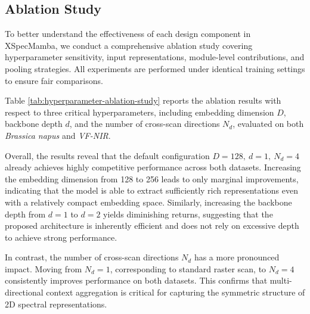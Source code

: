 \documentclass[pdflatex,sn-mathphys-num]{sn-jnl}%
\begin{document}
\subsection{Ablation Study}\label{sec:ablation-study}

To better understand the effectiveness of each design component in XSpecMamba, we conduct a comprehensive ablation study covering hyperparameter sensitivity, input representations, module-level contributions, and pooling strategies. All experiments are performed under identical training settings to ensure fair comparisons.

Table \ref{tab:hyperparameter-ablation-study} reports the ablation results with respect to three critical hyperparameters, including embedding dimension $D$, backbone depth $d$, and the number of cross-scan directions $N_d$, evaluated on both \textit{Brassica napus} and \textit{VF-NIR}.

Overall, the results reveal that the default configuration $D=128,\ d=1,\ N_d=4$ already achieves highly competitive performance across both datasets. Increasing the embedding dimension from 128 to 256 leads to only marginal improvements, indicating that the model is able to extract sufficiently rich representations even with a relatively compact embedding space. Similarly, increasing the backbone depth from $d=1$ to $d=2$ yields diminishing returns, suggesting that the proposed architecture is inherently efficient and does not rely on excessive depth to achieve strong performance.

In contrast, the number of cross-scan directions $N_d$ has a more pronounced impact. Moving from $N_d=1$, corresponding to standard raster scan, to $N_d=4$ consistently improves performance on both datasets. This confirms that multi-directional context aggregation is critical for capturing the symmetric structure of 2D spectral representations.
\end{document}
